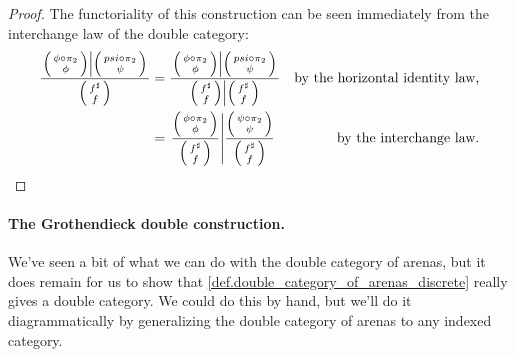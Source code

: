 \documentclass[DynamicalBook]{subfiles}
\begin{document}
\begin{proof}
  The functoriality of this construction can be seen immediately from the
  interchange law of the double category:
  \begin{align*}
  \frac{\left.\littlelens{\phi \circ \pi_2}{\phi} \middle| \littlelens{psi
    \circ \pi_2}{\psi} \right. }{\littlelens{f^{\sharp}}{f}} &= \frac{\left.\littlelens{\phi \circ \pi_2}{\phi} \middle| \littlelens{psi
    \circ \pi_2}{\psi} \right. }{\left. \littlelens{f^{\sharp}}{f} \middle| \littlelens{f^{\sharp}}{f} \right.} &\mbox{by the horizontal identity law,}\\
    &= \left.
      \frac{\littlelens{\phi \circ \pi_2}{\phi}}{\littlelens{f^{\sharp}}{f}}
      \middle|\frac{\littlelens{\psi \circ
          \pi_2}{\psi}}{\littlelens{f^{\sharp}}{f}} \right. &\mbox{by the interchange law.}
  \end{align*}
\end{proof}

\paragraph{The Grothendieck double
  construction.} \label{sec.groth_double_construction}

We've seen a bit of what we can do with the double category of arenas, but it does remain for us to show that \cref{def.double_category_of_arenas_discrete}
really gives a double category. We could do this by hand, but we'll do it
diagrammatically by generalizing the double category of arenas to any indexed
category.
\end{document}
